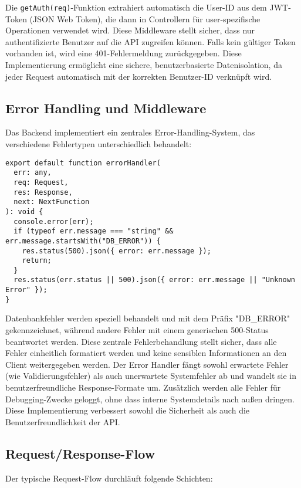 Die \texttt{getAuth(req)}-Funktion extrahiert automatisch die User-ID aus dem JWT-Token (JSON Web Token), die dann in Controllern für user-spezifische Operationen verwendet wird. Diese Middleware stellt sicher, dass nur authentifizierte Benutzer auf die API zugreifen können. Falls kein gültiger Token vorhanden ist, wird eine 401-Fehlermeldung zurückgegeben. Diese Implementierung ermöglicht eine sichere, benutzerbasierte Datenisolation, da jeder Request automatisch mit der korrekten Benutzer-ID verknüpft wird.

\subsection{Error Handling und Middleware}

Das Backend implementiert ein zentrales Error-Handling-System, das verschiedene Fehlertypen unterschiedlich behandelt:

\begin{lstlisting}[style=typescriptstyle,caption={Zentraler Error Handler}]
export default function errorHandler(
  err: any,
  req: Request,
  res: Response,
  next: NextFunction
): void {
  console.error(err);
  if (typeof err.message === "string" && err.message.startsWith("DB_ERROR")) {
    res.status(500).json({ error: err.message });
    return;
  }
  res.status(err.status || 500).json({ error: err.message || "Unknown Error" });
}
\end{lstlisting}

Datenbankfehler werden speziell behandelt und mit dem Präfix "DB\_ERROR" gekennzeichnet, während andere Fehler mit einem generischen 500-Status beantwortet werden. Diese zentrale Fehlerbehandlung stellt sicher, dass alle Fehler einheitlich formatiert werden und keine sensiblen Informationen an den Client weitergegeben werden. Der Error Handler fängt sowohl erwartete Fehler (wie Validierungsfehler) als auch unerwartete Systemfehler ab und wandelt sie in benutzerfreundliche Response-Formate um. Zusätzlich werden alle Fehler für Debugging-Zwecke geloggt, ohne dass interne Systemdetails nach außen dringen. Diese Implementierung verbessert sowohl die Sicherheit als auch die Benutzerfreundlichkeit der API.

\subsection{Request/Response-Flow}

Der typische Request-Flow durchläuft folgende Schichten:

